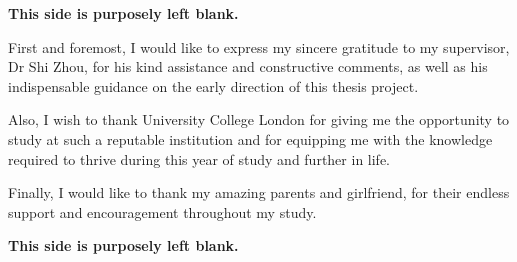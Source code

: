 \newpage
\thispagestyle{empty}
\vspace*{1em}
\begin{center}
    \textbf{This side is purposely left blank.}
\end{center}

\begin{acknowledgements}
\thispagestyle{empty}

First and foremost, I would like to express my sincere gratitude to my supervisor, Dr Shi Zhou, for his kind assistance and constructive comments, as well as his indispensable guidance on the early direction of this thesis project.

\vspace{5mm}

\noindent Also, I wish to thank University College London for giving me the opportunity to study at such a reputable institution and for equipping me with the knowledge required to thrive during this year of study and further in life.

\vspace{5mm}

\noindent Finally, I would like to thank my amazing parents and girlfriend, for their endless support and encouragement throughout my study.

\end{acknowledgements}

\setcounter{tocdepth}{2} 

\newpage
\thispagestyle{empty}
\vspace*{1em}
\begin{center}
    \textbf{This side is purposely left blank.}
\end{center}

\frontmatter

\renewcommand{\contentsname}{\textsc{Table of Contents}}
\renewcommand{\listtablename}{\textsc{List of Tables}}
\renewcommand{\listfigurename}{\textsc{List of Figures}}

\setcounter{tocdepth}{5}
\setcounter{secnumdepth}{5}
\tableofcontents
\listoffigures
\listoftables